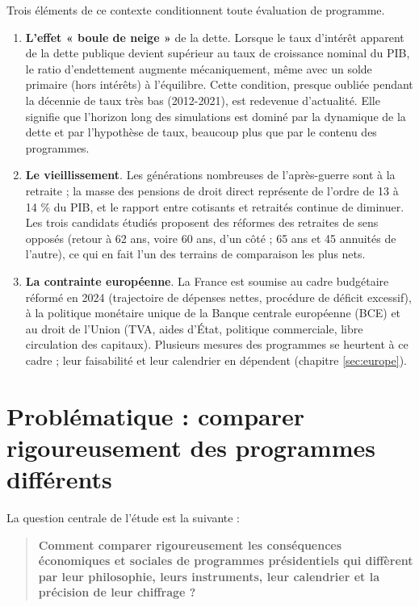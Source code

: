 \documentclass[
  11pt,
  11pt,
  a4paper,
  openany]{book}
\providecommand{\tightlist}{%
  \setlength{\itemsep}{0pt}\setlength{\parskip}{0pt}}
\begin{document}
Trois éléments de ce contexte conditionnent toute évaluation de
programme.

\begin{enumerate}
\def\labelenumi{\arabic{enumi}.}
\tightlist
\item
  \textbf{L'effet « boule de neige »} de la dette. Lorsque le taux
  d'intérêt apparent de la dette publique devient supérieur au taux de
  croissance nominal du PIB, le ratio d'endettement augmente
  mécaniquement, même avec un solde primaire (hors intérêts) à
  l'équilibre. Cette condition, presque oubliée pendant la décennie de
  taux très bas (2012-2021), est redevenue d'actualité. Elle signifie
  que l'horizon long des simulations est dominé par la dynamique de la
  dette et par l'hypothèse de taux, beaucoup plus que par le contenu des
  programmes.
\item
  \textbf{Le vieillissement}. Les générations nombreuses de
  l'après-guerre sont à la retraite ; la masse des pensions de droit
  direct représente de l'ordre de 13 à 14 \% du PIB, et le rapport entre
  cotisants et retraités continue de diminuer. Les trois candidats
  étudiés proposent des réformes des retraites de sens opposés (retour à
  62 ans, voire 60 ans, d'un côté ; 65 ans et 45 annuités de l'autre),
  ce qui en fait l'un des terrains de comparaison les plus nets.
\item
  \textbf{La contrainte européenne}. La France est soumise au cadre
  budgétaire réformé en 2024 (trajectoire de dépenses nettes, procédure
  de déficit excessif), à la politique monétaire unique de la Banque
  centrale européenne (BCE) et au droit de l'Union (TVA, aides d'État,
  politique commerciale, libre circulation des capitaux). Plusieurs
  mesures des programmes se heurtent à ce cadre ; leur faisabilité et
  leur calendrier en dépendent (chapitre \ref{sec:europe}).
\end{enumerate}

\hypertarget{sec:problematique}{%
\section{Problématique : comparer rigoureusement des programmes
différents}\label{sec:problematique}}

La question centrale de l'étude est la suivante :

\begin{quote}
\textbf{Comment comparer rigoureusement les conséquences économiques et
sociales de programmes présidentiels qui diffèrent par leur philosophie,
leurs instruments, leur calendrier et la précision de leur chiffrage ?}
\end{quote}
\end{document}
